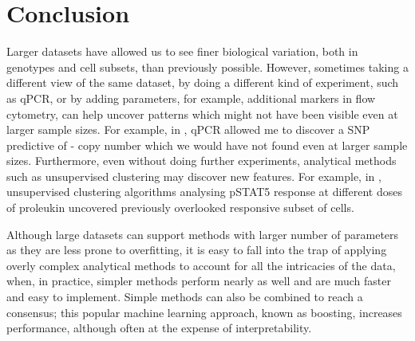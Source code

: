 


\section{Conclusion}


Larger datasets have allowed us to see finer biological variation, both in genotypes and cell subsets, than previously possible.
However, sometimes taking a different view of the same dataset, by doing a different kind of experiment, such as qPCR, or by adding parameters, for example, additional markers in flow cytometry, can help uncover patterns which might not have been visible even at larger sample sizes.
For example, in , qPCR allowed me to discover a SNP predictive of - copy number which we would have not found even at larger sample sizes.
Furthermore, even without doing further experiments, analytical methods such as unsupervised clustering may discover new features.
For example, in , unsupervised clustering algorithms analysing pSTAT5 response at different doses of proleukin uncovered previously overlooked responsive subset of cells.

Although large datasets can support methods with larger number of parameters as they are less prone to overfitting,
it is easy to fall into the trap of applying overly complex analytical methods to account for all the intricacies of the data,
when, in practice, simpler methods perform nearly as well and are much faster and easy to implement.
Simple methods can also be combined to reach a consensus; this popular machine learning approach, known as boosting, increases performance, although often at the expense of interpretability.

